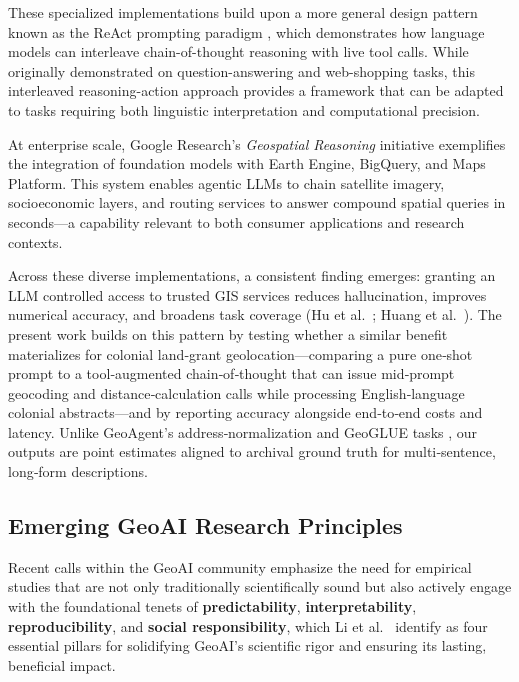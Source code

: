 These specialized implementations build upon a more general design
pattern known as the ReAct prompting paradigm \citep{yao2023react},
which demonstrates how language models can interleave chain-of-thought
reasoning with live tool calls. While originally demonstrated on
question-answering and web-shopping tasks, this interleaved
reasoning-action approach provides a framework that can be adapted to
tasks requiring both linguistic interpretation and computational
precision.

At enterprise scale, Google Research's \emph{Geospatial Reasoning}
initiative \citep{GoogleResearch2025_geospatial} exemplifies the
integration of foundation models with Earth Engine, BigQuery, and Maps
Platform. This system enables agentic LLMs to chain satellite imagery,
socioeconomic layers, and routing services to answer compound spatial
queries in seconds---a capability relevant to both consumer applications
and research contexts.

Across these diverse implementations, a consistent finding emerges:
granting an LLM controlled access to trusted GIS services reduces
hallucination, improves numerical accuracy, and broadens task coverage
(Hu et al.~\citep{Hu2024_toponym_llm}; Huang et
al.~\citep{Huang2024_geoagent}). The present work builds on this pattern
by testing whether a similar benefit materializes for colonial
land‑grant geolocation---comparing a pure one‑shot prompt to a
tool‑augmented chain‑of‑thought that can issue mid‑prompt geocoding and
distance‑calculation calls while processing English‑language colonial
abstracts---and by reporting accuracy alongside end‑to‑end costs and
latency. Unlike GeoAgent's address‑normalization and GeoGLUE tasks
\citep{Huang2024_geoagent, li2023geogluegeographiclanguageunderstanding},
our outputs are point estimates aligned to archival ground truth for
multi‑sentence, long‑form descriptions.

\subsection{Emerging GeoAI Research
Principles}\label{emerging-geoai-research-principles}

Recent calls within the GeoAI community emphasize the need for empirical
studies that are not only traditionally scientifically sound but also
actively engage with the foundational tenets of \textbf{predictability},
\textbf{interpretability}, \textbf{reproducibility}, and \textbf{social
responsibility}, which Li et al.~\citep{Li2024_geoai} identify as four
essential pillars for solidifying GeoAI's scientific rigor and ensuring
its lasting, beneficial impact.

